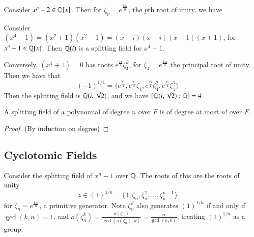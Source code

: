 \begin{example}
    Consider $x^p - 2 \in \mathbb Q[x]$. Then for $\zeta_p = e^{\frac{2\pi i}{p}}$, the $p$th root of unity, we have 
    \begin{center}
    \end{center}
\end{example}

\begin{example}
    Consider $(x^4 -1) = (x^2+1)(x^2-1) = (x-i)(x+i)(x-1)(x+1)$, for $x^4-1 \in \mathbb Q[x]$. Then $\mathbb Q(i)$ is a splitting field for $x^4-1$. 

    Conversely, $(x^4+1) = 0$ has roots $e^{\frac{\pi i}{4}}\zeta_4^k$, for $\zeta_4 = e^{\frac{2\pi i}{4}}$ the principal root of unity. Then we have that \begin{equation*}
        (-1)^{1/4} = \{e^{\frac{\pi i}{4}}, e^{\frac{\pi i}{4}}\zeta_4, e^{\frac{\pi i}{4}}\zeta_4^2, e^{\frac{\pi i}{4}}\zeta_4^3\} 
    \end{equation*}
    Then the splitting field is $\mathbb Q(i,\sqrt{2})$, and we have $[\mathbb Q(i,\sqrt{2}):\mathbb Q] = 4$.
\end{example}



\begin{proposition}
    A splitting field of a polynomial of degree $n$ over $F$ is of degree at most $n!$ over $F$.
\end{proposition}
\begin{proof}
    (By induction on degree)
\end{proof}


\subsection{Cyclotomic Fields}

Consider the splitting field of $x^n -1$ over $\mathbb Q$. The roots of this are the roots of unity $$z \in (1)^{1/n} = \{1, \zeta_n,\zeta_n^2,...,\zeta_n^{n-1}\}$$ for $\zeta_n = e^{\frac{2\pi i}{n}}$, a primitive generator. Note $\zeta_n^k$ also generates $(1)^{1/n}$ if and only if $\gcd(k,n) = 1$, and $o(\zeta_n^k) = \frac{o(\zeta_n)}{\gcd(o(\zeta_n),k)} = \frac{n}{\gcd(n,k)}$, treating $(1)^{1/n}$ as a group. 

